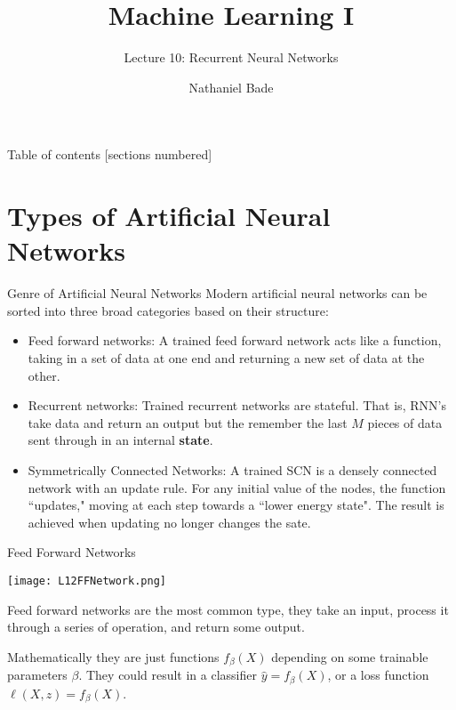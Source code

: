 \documentclass[10pt, table, dvipsnames,xcdraw, handout]{beamer}
\title{Machine Learning I}
\subtitle{Lecture 10: Recurrent Neural Networks}
\date{}
\author{Nathaniel Bade}
\institute{Northeastern University Department of Mathematics}
\begin{document}
\maketitle

\begin{frame}{Table of contents}
  [sections numbered]
  \tableofcontents[hideallsubsections]
\end{frame}





\section{Types of Artificial Neural Networks}
\begin{frame}[fragile]{Genre of Artificial Neural Networks}
Modern artificial neural networks can be sorted into three broad categories based on their structure:

\begin{itemize}
\item[] Feed forward networks: A trained feed forward network acts like a function, taking in a set of data at one end and returning a new set of data at the other.\pause

\item[] Recurrent networks: Trained recurrent networks are stateful. That is, RNN's take data and return an output but the remember the last $M$ pieces of data sent through in an internal \textbf{state}. \pause

\item[] Symmetrically Connected Networks: A trained SCN is a densely connected network with an update rule. For any initial value of the nodes, the function ``updates," moving at each step towards a ``lower energy state". The result is achieved when updating no longer changes the sate. 
\end{itemize}
\end{frame}





\begin{frame}[fragile]{Feed Forward Networks}
  \begin{minipage}[t][0.5\textheight][t]{\textwidth}
	\centering \texttt{[image: L12FFNetwork.png]} 
  \end{minipage}
  \vfill
\begin{minipage}[t][0.5\textheight][t]{\textwidth}
Feed forward networks are the most common type, they take an input, process it through a series of operation, and return some output. \newline\pause 

Mathematically they are just functions $f_\beta (X)$ depending on some trainable parameters $\beta$. They could result in a classifier $\hat{y} = f_\beta (X)$, or a loss function $\ell(X,z) = f_\beta (X)$. 
\end{minipage}
\end{frame}
\end{document}

